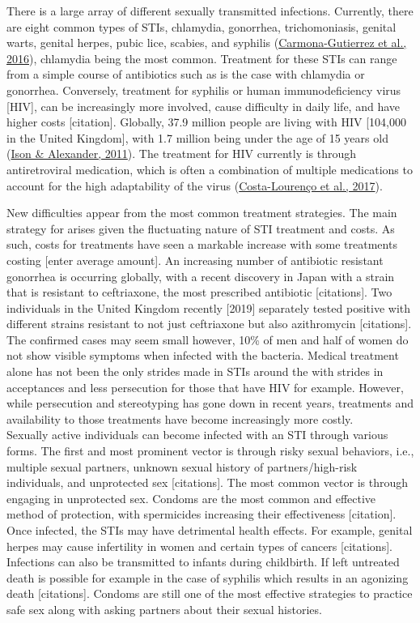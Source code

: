 \documentclass[
  donotrepeattitle,doc, 12pt, a4paper,floatsintext]{apa7}
\begin{document}
There is a large array of different sexually transmitted infections. Currently, there are eight common types of STIs, chlamydia, gonorrhea, trichomoniasis, genital warts, genital herpes, pubic lice, scabies, and syphilis (\protect\hyperlink{ref-carmonagutierrez2016}{Carmona-Gutierrez et al., 2016}), chlamydia being the most common. Treatment for these STIs can range from a simple course of antibiotics such as is the case with chlamydia or gonorrhea. Conversely, treatment for syphilis or human immunodeficiency virus {[}HIV{]}, can be increasingly more involved, cause difficulty in daily life, and have higher costs {[}citation{]}. Globally, 37.9 million people are living with HIV {[}104,000 in the United Kingdom{]}, with 1.7 million being under the age of 15 years old (\protect\hyperlink{ref-ison2011}{Ison \& Alexander, 2011}). The treatment for HIV currently is through antiretroviral medication, which is often a combination of multiple medications to account for the high adaptability of the virus (\protect\hyperlink{ref-costalourenco2017}{Costa-Lourenço et al., 2017}).

New difficulties appear from the most common treatment strategies. The main strategy for arises given the fluctuating nature of STI treatment and costs. As such, costs for treatments have seen a markable increase with some treatments costing {[}enter average amount{]}. An increasing number of antibiotic resistant gonorrhea is occurring globally, with a recent discovery in Japan with a strain that is resistant to ceftriaxone, the most prescribed antibiotic {[}citations{]}. Two individuals in the United Kingdom recently {[}2019{]} separately tested positive with different strains resistant to not just ceftriaxone but also azithromycin {[}citations{]}. The confirmed cases may seem small however, 10\% of men and half of women do not show visible symptoms when infected with the bacteria. Medical treatment alone has not been the only strides made in STIs around the with strides in acceptances and less persecution for those that have HIV for example. However, while persecution and stereotyping has gone down in recent years, treatments and availability to those treatments have become increasingly more costly.\\
Sexually active individuals can become infected with an STI through various forms. The first and most prominent vector is through risky sexual behaviors, i.e., multiple sexual partners, unknown sexual history of partners/high-risk individuals, and unprotected sex {[}citations{]}. The most common vector is through engaging in unprotected sex. Condoms are the most common and effective method of protection, with spermicides increasing their effectiveness {[}citation{]}. Once infected, the STIs may have detrimental health effects. For example, genital herpes may cause infertility in women and certain types of cancers {[}citations{]}. Infections can also be transmitted to infants during childbirth. If left untreated death is possible for example in the case of syphilis which results in an agonizing death {[}citations{]}. Condoms are still one of the most effective strategies to practice safe sex along with asking partners about their sexual histories.
\end{document}
